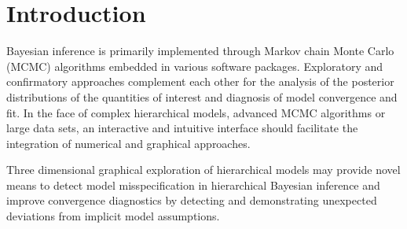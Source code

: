 \documentclass[11pt,notitlepage]{article}
\begin{document}
\section*{Introduction}

Bayesian inference is primarily implemented through Markov chain Monte Carlo (MCMC) algorithms embedded in various software packages. Exploratory and confirmatory approaches complement each other for the analysis of the posterior distributions of the quantities of interest and diagnosis of model convergence and fit. In the face of complex hierarchical models, advanced MCMC algorithms or large data sets, an interactive and intuitive interface should facilitate the integration of numerical and graphical approaches.  

Three dimensional graphical exploration of hierarchical models may provide novel means to detect model misspecification in hierarchical Bayesian inference and improve convergence diagnostics by detecting and demonstrating unexpected deviations from implicit model assumptions.
\end{document}
